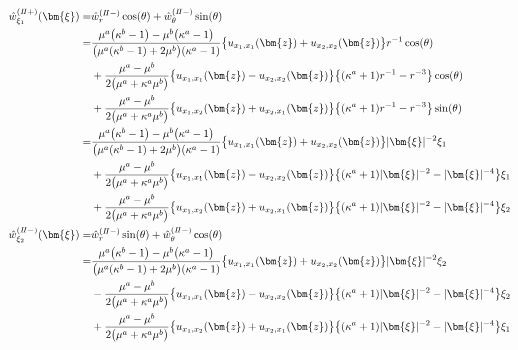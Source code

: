 \begin{align}
	\hat{w}_{\xi_{1}}^{(I\hspace{-.15em}I+)}(\bm{\xi})
	=&\hat{w}_{r}^{(I\hspace{-.15em}I-)}\cos(\theta)+\hat{w}_{\theta}^{(I\hspace{-.15em}I-)}\sin(\theta)
	\nonumber
	\\
	=&\frac{\mu^{a}\bigl(\kappa^{b}-1\bigr)-\mu^{b}\bigl(\kappa^{a}-1\bigr)}
			{\bigl(\mu^{a}(\kappa^{b}-1)+2\mu^{b}\bigr)(\kappa^{a}-1)}
			\bigl\{u_{x_{1},x_{1}}(\bm{z})+u_{x_{2},x_{2}}(\bm{z})\bigr\}r^{-1}\cos(\theta)
		\nonumber
		\\
		&+\frac{\mu^{a}-\mu^{b}}{2\bigl(\mu^{a}+\kappa^{a}\mu^{b}\bigr)}
		\bigl\{u_{x_{1},x_{1}}(\bm{z})-u_{x_{2},x_{2}}(\bm{z})\bigr\}
		\bigl\{(\kappa^{a}+1)r^{-1}-r^{-3}\bigr\}\cos(\theta)
		\nonumber
		\\
		&+\frac{\mu^{a}-\mu^{b}}{2\bigl(\mu^{a}+\kappa^{a}\mu^{b}\bigr)}
		\bigl\{u_{x_{1},x_{2}}(\bm{z})+u_{x_{2},x_{1}}(\bm{z})\bigr\}
		\bigl\{(\kappa^{a}+1)r^{-1}-r^{-3}\bigr\}\sin(\theta)
		\nonumber
		\\
	=&\frac{\mu^{a}\bigl(\kappa^{b}-1\bigr)-\mu^{b}\bigl(\kappa^{a}-1\bigr)}
			{\bigl(\mu^{a}(\kappa^{b}-1)+2\mu^{b}\bigr)(\kappa^{a}-1)}
			\bigl\{u_{x_{1},x_{1}}(\bm{z})+u_{x_{2},x_{2}}(\bm{z})\bigr\}|\bm{\xi}|^{-2}\xi_{1}
		\nonumber
		\\
		&+\frac{\mu^{a}-\mu^{b}}{2\bigl(\mu^{a}+\kappa^{a}\mu^{b}\bigr)}
		\bigl\{u_{x_{1},x_{1}}(\bm{z})-u_{x_{2},x_{2}}(\bm{z})\bigr\}
		\bigl\{(\kappa^{a}+1)|\bm{\xi}|^{-2}-|\bm{\xi}|^{-4}\bigr\}\xi_{1}
		\nonumber
		\\
		&+\frac{\mu^{a}-\mu^{b}}{2\bigl(\mu^{a}+\kappa^{a}\mu^{b}\bigr)}
		\bigl\{u_{x_{1},x_{2}}(\bm{z})+u_{x_{2},x_{1}}(\bm{z})\bigr\}
		\bigl\{(\kappa^{a}+1)|\bm{\xi}|^{-2}-|\bm{\xi}|^{-4}\bigr\}\xi_{2}
	\\
	\hat{w}_{\xi_{2}}^{(I\hspace{-.15em}I-)}(\bm{\xi})=&
			\hat{w}_{r}^{(I\hspace{-.15em}I-)}\sin(\theta)+\hat{w}_{\theta}^{(I\hspace{-.15em}I-)}\cos(\theta)
		\nonumber
		\\
		=&\frac{\mu^{a}\bigl(\kappa^{b}-1\bigr)-\mu^{b}\bigl(\kappa^{a}-1\bigr)}
			{\bigl(\mu^{a}(\kappa^{b}-1)+2\mu^{b}\bigr)(\kappa^{a}-1)}
			\bigl\{u_{x_{1},x_{1}}(\bm{z})+u_{x_{2},x_{2}}(\bm{z})\bigr\}|\bm{\xi}|^{-2}\xi_{2}
		\nonumber
		\\
		&-\frac{\mu^{a}-\mu^{b}}{2\bigl(\mu^{a}+\kappa^{a}\mu^{b}\bigr)}
		\bigl\{u_{x_{1},x_{1}}(\bm{z})-u_{x_{2},x_{2}}(\bm{z})\bigr\}
		\bigl\{(\kappa^{a}+1)|\bm{\xi}|^{-2}-|\bm{\xi}|^{-4}\bigr\}\xi_{2}
		\nonumber
		\\
		&+\frac{\mu^{a}-\mu^{b}}{2\bigl(\mu^{a}+\kappa^{a}\mu^{b}\bigr)}
		\bigl\{u_{x_{1},x_{2}}(\bm{z})+u_{x_{2},x_{1}}(\bm{z})\bigr\}
		\bigl\{(\kappa^{a}+1)|\bm{\xi}|^{-2}-|\bm{\xi}|^{-4}\bigr\}\xi_{1}
\end{align}
